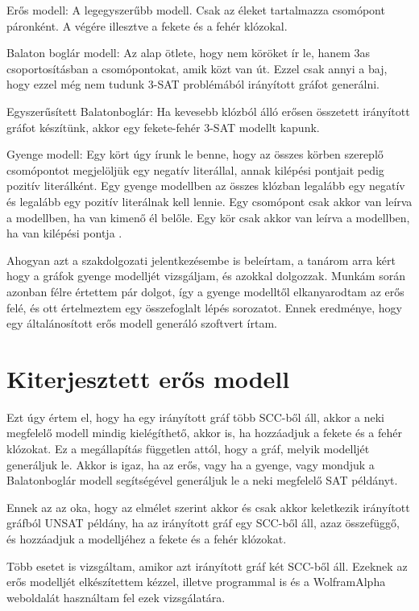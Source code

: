 \documentclass[
]{thesis-ekf}
\theoremstyle{definition}
\theoremstyle{remark}
\begin{document}
	Erős modell: A legegyszerűbb modell. Csak az éleket tartalmazza csomópont páronként. A végére illesztve a fekete és a fehér klózokal.
		
	Balaton boglár modell: Az alap ötlete, hogy nem köröket ír le, hanem 3as csoportosításban a csomópontokat, amik közt van út. Ezzel csak annyi a baj, hogy ezzel még nem tudunk 3-SAT problémából irányított gráfot generálni.
	
	Egyszerűsített Balatonboglár: Ha kevesebb klózból álló erősen összetett irányított gráfot készítünk, akkor egy fekete-fehér 3-SAT modellt kapunk.

	Gyenge modell: Egy kört úgy írunk le benne, hogy az összes körben szereplő csomópontot megjelöljük egy negatív literállal, annak kilépési pontjait pedig pozitív literálként. Egy gyenge modellben az összes klózban legalább egy negatív és legalább egy pozitív literálnak kell lennie. Egy csomópont csak akkor van leírva a modellben, ha van kimenő él belőle. Egy kör csak akkor van leírva a modellben, ha van kilépési pontja \cite{sat-solving-50}.
	
	Ahogyan azt a szakdolgozati jelentkezésembe is beleírtam, a tanárom arra kért hogy a gráfok gyenge modelljét vizsgáljam, és azokkal dolgozzak. Munkám során azonban félre értettem pár dolgot, így a gyenge modelltől elkanyarodtam az erős felé, és ott értelmeztem egy összefoglalt lépés sorozatot. Ennek eredménye, hogy egy általánosított erős modell generáló szoftvert írtam.

	\section{Kiterjesztett erős modell}
	Ezt úgy értem el, hogy ha egy irányított gráf több SCC-ből áll, akkor a neki megfelelő modell mindig kielégíthető, akkor is, ha hozzáadjuk a fekete és a fehér klózokat. Ez a megállapítás független attól, hogy a gráf, melyik modelljét generáljuk le. Akkor is igaz, ha az erős, vagy ha a gyenge, vagy mondjuk a Balatonboglár modell segítségével generáljuk le a neki megfelelő SAT példányt.
	
	Ennek az az oka, hogy az elmélet szerint akkor és csak akkor keletkezik irányított gráfból UNSAT példány, ha az irányított gráf egy SCC-ből áll, azaz összefüggő, és hozzáadjuk a modelljéhez a fekete és a fehér klózokat.
	
	Több esetet is vizsgáltam, amikor azt irányított gráf két SCC-ből áll. Ezeknek az erős modelljét elkészítettem kézzel, illetve programmal is és a WolframAlpha weboldalát használtam fel ezek vizsgálatára.
	
\end{document}
